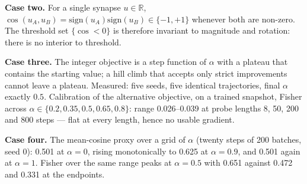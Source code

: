 \documentclass[11pt]{article}
\begin{document}
\textbf{Case two.} For a single synapse $u \in \mathbb{R}$,
$\cos(u_A, u_B) = \mathrm{sign}(u_A)\mathrm{sign}(u_B) \in \{-1, +1\}$ whenever both are non-zero.
The threshold set $\{\cos < 0\}$ is therefore invariant to magnitude and rotation: there is no
interior to threshold.

\textbf{Case three.} The integer objective is a step function of $\alpha$ with a plateau that
contains the starting value; a hill climb that accepts only strict improvements cannot leave a
plateau. Measured: five seeds, five identical trajectories, final $\alpha$ exactly $0.5$.
Calibration of the alternative objective, on a trained snapshot, Fisher across
$\alpha \in \{0.2, 0.35, 0.5, 0.65, 0.8\}$: range 0.026--0.039 at probe lengths 8, 50, 200 and 800
steps --- flat at every length, hence no usable gradient.

\textbf{Case four.} The mean-cosine proxy over a grid of $\alpha$ (twenty steps of 200 batches,
seed 0): 0.501 at $\alpha=0$, rising monotonically to 0.625 at $\alpha=0.9$, and 0.501 again at
$\alpha=1$. Fisher over the same range peaks at $\alpha = 0.5$ with 0.651 against 0.472 and 0.331
at the endpoints.
\end{document}
